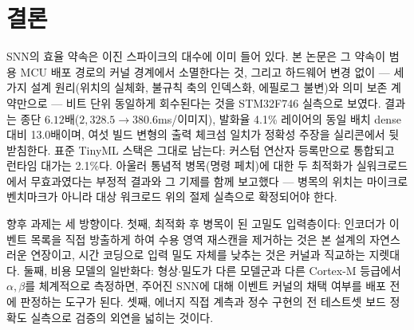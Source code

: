 \section{결론}\label{sec:conclusion}

SNN의 효율 약속은 이진 스파이크의 대수에 이미 들어 있다. 본 논문은
그 약속이 범용 MCU 배포 경로의 커널 경계에서 소멸한다는 것, 그리고
하드웨어 변경 없이 --- 세 가지 설계 원리(위치의 실체화, 불규칙
축의 인덱스화, 에필로그 불변)와 의미 보존 계약만으로 --- 비트
단위 동일하게 회수된다는 것을 STM32F746 실측으로 보였다. 결과는
종단 $6.12$배($2{,}328.5\rightarrow380.6$ms/이미지), 발화율 4.1\%
레이어의 동일 배치 dense 대비 13.0배이며, 여섯 빌드 변형의 출력
체크섬 일치가 정확성
주장을 실리콘에서 뒷받침한다. 표준 TinyML 스택은 그대로 남는다:
커스텀 연산자 등록만으로 통합되고 런타임 대가는 2.1\%다. 아울러 통념적
병목(명령 페치)에 대한 두 최적화가 실워크로드에서 무효과였다는
부정적 결과와 그 기제를 함께 보고했다 --- 병목의 위치는
마이크로벤치마크가 아니라 대상 워크로드 위의 절제 실측으로
확정되어야 한다.

향후 과제는 세 방향이다. 첫째, 최적화 후 병목이 된 고밀도
입력층이다: 인코더가 이벤트 목록을 직접 방출하게 하여 수용 영역
재스캔을 제거하는 것은 본 설계의 자연스러운 연장이고, 시간 코딩으로
입력 밀도 자체를 낮추는 것은 커널과 직교하는 지렛대다. 둘째, 비용
모델의 일반화다: 형상$\cdot$밀도가 다른 모델군과 다른 Cortex-M
등급에서 $\alpha,\beta$를 체계적으로 측정하면, 주어진 SNN에 대해
이벤트 커널의 채택 여부를 배포 전에 판정하는 도구가 된다. 셋째,
에너지 직접 계측과 정수 구현의 전 테스트셋 보드 정확도 실측으로
검증의 외연을 넓히는 것이다.
